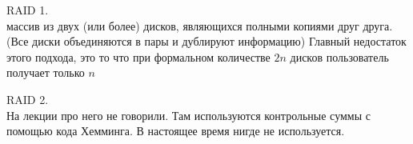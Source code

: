 \begin{figure}[h!]
\begin{minipage}[h]{0.49\linewidth}
\end{minipage}
\hfill
\begin{minipage}[h]{0.49\linewidth}
\end{minipage}
\end{figure}

RAID 1. \\
массив из двух (или более) дисков, являющихся полными копиями друг друга. (Все диски объединяются в пары и дублируют информацию)
Главный недостаток этого подхода, это то что при формальном количестве $2n$ дисков пользователь получает только $n$

RAID 2. \\
На лекции про него не говорили. Там используются контрольные суммы с помощью кода Хемминга. В настоящее время нигде не используется. 

